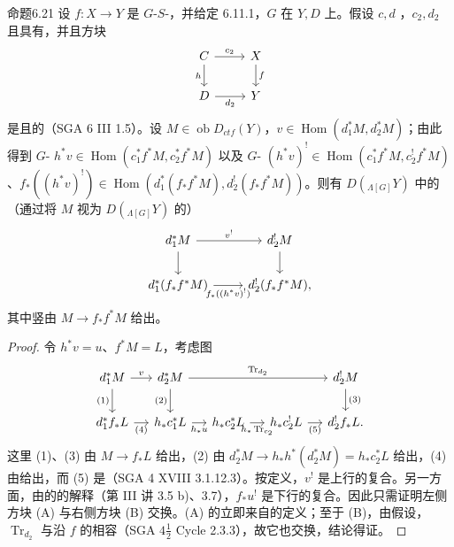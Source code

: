 \begin{SGAresult}{命题}{6.21}
设 $f:X\to Y$ 是 $G$-$S$-，并给定 6.11.1，$G$ 在 $Y,D$ 上。假设 $c,d$ ，$c_2,d_2$ 且具有，并且方块
\[\begin{tikzcd}C\arrow[r,"c_2"]\arrow[d,"h"']&X\arrow[d,"f"]\\D\arrow[r,"d_2"']&Y\end{tikzcd}\]
是且的（SGA 6 III 1.5）。设 $M\in\operatorname{ob}D_{ctf}(Y)$，$v\in\operatorname{Hom}(d_1^*M,d_2^*M)$；由此得到 $G$- $h^*v\in\operatorname{Hom}(c_1^*f^*M,c_2^*f^*M)$ 以及 $G$- $(h^*v)^!\in\operatorname{Hom}(c_1^*f^*M,c_2^!f^*M)$、$f_*((h^*v)^!)\in\operatorname{Hom}(d_1^*(f_*f^*M),d_2^!(f_*f^*M))$。则有 $D({}_{\Lambda[G]}Y)$ 中的（通过将 $M$ 视为 $D({}_{\Lambda[G]}Y)$ 的）
\[\begin{tikzcd}d_1^*M\arrow[r,"v^!"]\arrow[d]&d_2^!M\arrow[d]\\d_1^*(f_*f^*M)\arrow[r,"f_*((h^*v)^!)"']&d_2^!(f_*f^*M),\end{tikzcd}\]
其中竖由 $M\to f_*f^*M$ 给出。
\end{SGAresult}
\begin{proof}令 $h^*v=u$、$f^*M=L$，考虑图
\[\begin{tikzcd}[column sep=small]
d_1^*M\arrow[r,"v"]\arrow[d,"(1)"']&d_2^*M\arrow[rrr,"\operatorname{Tr}_{d_2}"]\arrow[d,"(2)"']&&&d_2^!M\arrow[d,"(3)"]\\
d_1^*f_*L\arrow[r,"(4)"']&h_*c_1^*L\arrow[r,"h_*u"']&h_*c_2^*L\arrow[r,"h_*\operatorname{Tr}_{c_2}"']&h_*c_2^!L\arrow[r,"(5)"']&d_2^!f_*L.
\end{tikzcd}\]
这里 (1)、(3) 由 $M\to f_*L$ 给出，(2) 由 $d_2^*M\to h_*h^*(d_2^*M)=h_*c_2^*L$ 给出，(4) 由给出，而 (5) 是（SGA 4 XVIII 3.1.12.3）。按定义，$v^!$ 是上行的复合。另一方面，由的的解释（第 III 讲 3.5 b)、3.7），$f_*u^!$ 是下行的复合。因此只需证明左侧方块 (A) 与右侧方块 (B) 交换。(A) 的立即来自的定义；至于 (B)，由假设，$\operatorname{Tr}_{d_2}$ 与沿 $f$ 的相容（SGA $4\frac12$ Cycle 2.3.3），故它也交换，结论得证。\end{proof}

